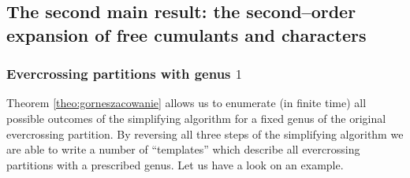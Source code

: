 \documentclass[12pt,dvips]{amsart}
\numberwithin{equation}{section} \numberwithin{figure}{section}
\theoremstyle{plain}
\theoremstyle{definition}
\theoremstyle{remark}
\begin{document}
\subsection{The second main result:
the second--order expansion of free cumulants and characters}
\label{sec:secondorderexp}
\subsubsection{Evercrossing partitions with genus $1$}
Theorem \ref{theo:gorneszacowanie} allows us to enumerate (in finite
time) all possible outcomes of the simplifying algorithm for a fixed
genus of the original evercrossing partition. By reversing all three
steps of the simplifying algorithm we are able to write a number of
``templates'' which describe all evercrossing partitions with a
prescribed genus. Let us have a look on an example.
\end{document}
